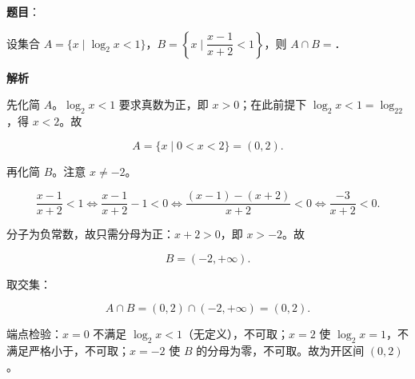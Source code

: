 \begin{answer}

\textbf{题目}：

设集合 $A=\{x\mid\log_2x<1\}$，$B=\left\{x\mid\dfrac{x-1}{x+2}<1\right\}$，则 $A\cap B=$\gkblank{}．

\textbf{解析}

先化简 $A$。$\log_2x<1$ 要求真数为正，即 $x>0$；在此前提下 $\log_2x<1=\log_22$，得 $x<2$。故

\nopagebreak[4]
\[A=\{x\mid0<x<2\}=(0,2).\]

再化简 $B$。注意 $x\neq-2$。

\nopagebreak[4]
\[\frac{x-1}{x+2}<1\iff\frac{x-1}{x+2}-1<0\iff\frac{(x-1)-(x+2)}{x+2}<0\iff\frac{-3}{x+2}<0.\]

分子为负常数，故只需分母为正：$x+2>0$，即 $x>-2$。故

\nopagebreak[4]
\[B=(-2,+\infty).\]

取交集：

\nopagebreak[4]
\[A\cap B=(0,2)\cap(-2,+\infty)=(0,2).\]

端点检验：$x=0$ 不满足 $\log_2x<1$（无定义），不可取；$x=2$ 使 $\log_2x=1$，不满足严格小于，不可取；$x=-2$ 使 $B$ 的分母为零，不可取。故为开区间 $(0,2)$。


\end{answer}
